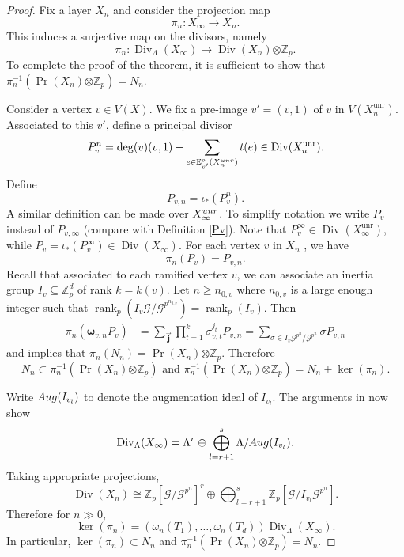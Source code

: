 \documentclass{amsart}
\numberwithin{equation}{section}
\theoremstyle{remark}
\newcommand{\Div}{\operatorname{Div}}
\newcommand{\unr}{\operatorname{unr}}
\newcommand{\rk}{\operatorname{rank}}
\newcommand{\Z}{\mathbb{Z}}
\newcommand{\E}{\mathbb{E}}
\newcommand{\bomega}{\boldsymbol{\omega}}
\theoremstyle{plain} %
\begin{document}
\begin{proof}
Fix a layer $X_n$ and consider the projection map
\[
\pi_n \colon X_\infty \longrightarrow X_n. 
\]
This induces a surjective map on the divisors, namely
\[
\pi_n \colon \Div_{\Lambda}(X_\infty) \longrightarrow \Div(X_n){\otimes \Z_p}.
\]
To complete the proof of the theorem, it is sufficient to show that $\pi_n^{-1}(\Pr(X_n){\otimes \Z_p}) = N_n$.

{Consider a vertex $v\in V(X)$. %
We fix a pre-image $v'=(v,1)$ of $v$ in $V(X_n^{\unr})$.
Associated to this $v'$, define a principal divisor %
\[
P_v^n=\deg(v)(v,1)-\sum_{e\in \E^o_{v'}(X_n^{\textup{unr}})}t(e) \in \Div(X_n^{\unr}).
\]}
Define
\[
P_{v,n} = \iota_{*}(P^n_v).
\]
A similar definition can be made over $X^{\textup{unr}}_\infty$.
{To simplify notation we write $P_v$ instead of $P_{v,\infty}$ (compare with Definition \ref{Pv}).
Note that $P^\infty_{v}\in \Div(X_\infty^{\unr})$, while $P_v = \iota_*(P_v^{\infty}) \in \Div(X_\infty)$.}
For each vertex $v$ in $X_n$ , we have
\[
\pi_n(P_{v}) =P_{v,n}.
\]
Recall that associated to each ramified vertex $v$, we can associate a{n inertia} group $I_v \subseteq \Z_p^d$ of rank $k = k(v)$.
Let $n\geq n_{0,v}$ where $n_{0,v}$ is a large enough integer such that $\rk_p(I_v\mathcal{G}/\mathcal{G}^{p^{n_{0,v}}})=\rk_p(I_v)$.
Then
\begin{align*}
\pi_n(\bomega_{v,n}P_{v}) & =\sum_{\vec{\mathbf{j}}}\prod_{t=1}^k\sigma_{v,t}^{j_t}P_{v,n}=\sum_{\sigma \in I_v\mathcal{G}^{p^n}/ \mathcal{G}^{p^n}}\sigma P_{v,n}
\end{align*}
and \cite[Corollary 4.7]{GV24} implies that $\pi_n(N_n)=\Pr(X_n){\otimes \Z_p}$. Therefore 
\[
N_n\subset \pi_n^{-1}(\Pr(X_n){\otimes \Z_p}) \textrm{ and } \pi_n^{-1}(\Pr(X_n){\otimes \Z_p})=N_n+\ker(\pi_n).
\]

Write $\textup{Aug}(I_{v_l})$ to denote the augmentation ideal of $I_{v_l}$.
The arguments in \cite[Section 5]{GV24} now show
\[\Div_\Lambda(X_\infty)=\Lambda^r\oplus \bigoplus_{l=r+1}^s \Lambda/\textup{Aug}(I_{v_l}).
\]
Taking appropriate projections,
\[
\Div(X_n)\cong \Z_p[\mathcal{G}/\mathcal{G}^{p^n}]^r\oplus \bigoplus_{l=r+1}^s \Z_p[\mathcal{G}/I_{v_l}\mathcal{G}^{p^n}].
\]
Therefore for $n\gg 0$,
\[
\ker(\pi_n)=(\omega_n(T_1),\dots,\omega_n(T_d))\Div_\Lambda(X_\infty).
\]
In particular, $\ker(\pi_n)\subset N_n$ and $\pi_n^{-1}(\Pr(X_n){\otimes \Z_p})=N_n$. 

\end{proof}
\end{document}
